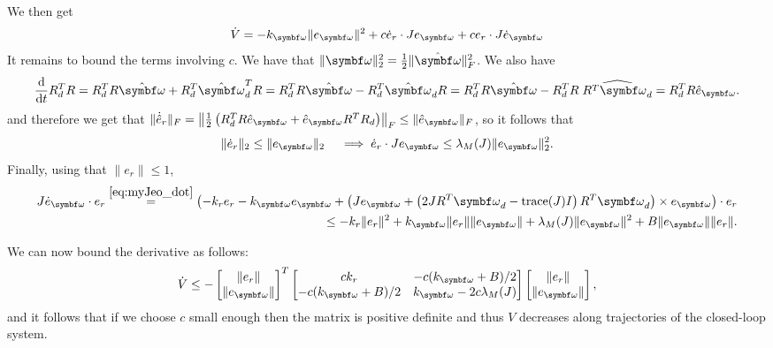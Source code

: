 We then get
\begin{equation}
  \begin{aligned}
    \dot V = -k_\bomega \| e_\bomega \|^2 + c \dot e_r \cdot J e_\bomega + c e_r \cdot J \dot e_\bomega
  \end{aligned}
\end{equation}
It remains to bound the terms involving $c$. We have that $\| \bomega \|_2^2 = \frac{1}{2} \| \hat \bomega \|_F^2$. We also have
\begin{equation}
  \frac{\mathrm{d}}{\mathrm{d}t} R_d^T R = R_d^T R \hat \bomega + R_d^T \hat \bomega_d^T R = R_d^T R \hat \bomega - R_d^T \hat \bomega_d R = R_d^T R \hat \bomega - R_d^T R \; \widehat{R^T \bomega_d} = R_d^T R \hat e_\bomega.
\end{equation}
and therefore we get that $\| \dot {\hat {e}}_r \|_F = \left\| \frac{1}{2} \left( R_d^T R \hat e_\bomega + \hat e_\bomega R^T R_d \right) \right\|_F \leq \| \hat e_\bomega \|_F$, so it follows that
\begin{equation}
  \| \dot e_r \|_2 \leq \| e_\bomega \|_2 \quad \implies \dot e_r \cdot J e_\bomega \leq \lambda_M(J) \| e_\bomega \|^2_2.
\end{equation}
Finally, using that $\| e_r \| \leq 1$,
\begin{equation}
  \begin{aligned}
    J \dot e_\bomega \cdot  e_r  \overset{\eqref{eq:myJeo_dot}}= \left( -k_r e_r - k_\bomega e_\bomega + \left( J e_\bomega + \left(2 J R^T \bomega_d - \text{trace}(J) I \right) R^T \bomega_d \right) \times e_\bomega \right) \cdot e_r \\
    \leq - k_r \| e_r \|^2 + k_\bomega \| e_r \| \| e_\bomega \| + \lambda_M(J) \| e_\bomega \|^2 + B \| e_\bomega \| \| e_r \|.
  \end{aligned}
\end{equation}
\begin{tcolorbox}
  We can now bound the derivative as follows:
  \begin{equation}
    \dot V \leq
    - \begin{bmatrix}
      \| e_r \| \\ \| e_\bomega \|
    \end{bmatrix}^T
    \begin{bmatrix}
      c k_r               & -c(k_\bomega + B)/2         \\
      -c(k_\bomega + B)/2 & k_\bomega - 2c \lambda_M(J)
    \end{bmatrix}
    \begin{bmatrix}
      \| e_r \| \\ \| e_\bomega \|
    \end{bmatrix},
  \end{equation}
  and it follows that if we choose $c$ small enough then the matrix is positive definite and thus $V$ decreases along trajectories of the closed-loop system.
\end{tcolorbox}


